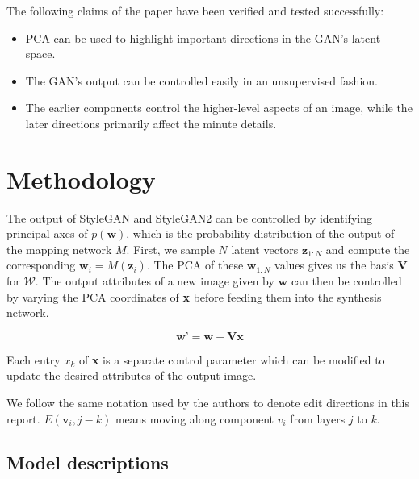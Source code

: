 \documentclass{article}
\begin{document}
The following claims of the paper have been verified and tested successfully:
\begin{itemize}
    \item PCA can be used to highlight important directions in the GAN's latent space.
    \item The GAN's output can be controlled easily in an unsupervised fashion.
    \item The earlier components control the higher-level aspects of an image, while the later directions primarily affect the minute details.
\end{itemize}


\section{Methodology}



The output of StyleGAN and StyleGAN2 can be controlled by identifying principal axes of $p(\textbf{w})$, which is the probability distribution of the output of the mapping network $M$. First, we sample $N$ latent vectors $\textbf{z}_{1:N}$ and compute the corresponding $\textbf{w}_{i} = M(\textbf{z}_{i})$. The PCA of these $\textbf{w}_{1:N}$ values gives us the basis $\textbf{V}$ for $\mathcal{W}$. The output attributes of a new image given by $\textbf{w}$ can then be controlled by varying the PCA coordinates of \textbf{x} before feeding them into the synthesis network.

\begin{equation}
    \textbf{w'} = \textbf{w} + \textbf{Vx}
\end{equation}

Each entry $x_{k}$ of \textbf{x} is a separate control parameter which can be modified to update the desired attributes of the output image.

We follow the same notation used by the authors to denote edit directions in this report. $E(\textbf{v}_{i}, j-k)$ means moving along component $v_{i}$ from layers $j$ to $k$.

\subsection{Model descriptions}
\end{document}
